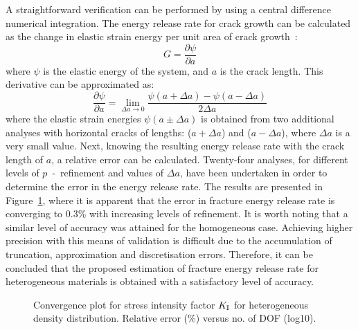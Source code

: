 \documentclass[onecolumn]{svjour3}
\begin{document}
A straightforward verification can be performed by using a central difference numerical integration. The energy release rate for crack growth can be calculated as the change in elastic strain energy per unit area of crack growth~\cite{Griffith163}:
\begin{equation}
G = \frac{\partial \psi}{\partial a}
\end{equation}
where $\psi$ is the elastic energy of the system, and $a$ is the crack length. This derivative can be approximated as:
\begin{equation}
 \frac{\partial \psi}{\partial a} = \lim_{\Delta a \to 0} \frac{\psi(a + \Delta a) - \psi(a -\Delta a)}{2\Delta a}
\end{equation}
where the elastic strain energies $\psi(a \pm \Delta a)$ is obtained from two additional analyses with horizontal cracks of lengths: ($a + \Delta a$) and ($a - \Delta a$), where $\Delta a$ is a very small value. 
Next, knowing the resulting energy release rate with the crack length of $a$, a relative error can be calculated. 
Twenty-four analyses, for different levels of $p$~-~refinement and values of $\Delta a$, have been undertaken in order to determine the error in the energy release rate. 
The results are presented in Figure~\ref{fig:covergencefdm}, where it is apparent that the error in fracture energy release rate is converging to 0.3\% 
with increasing levels of refinement. It is worth noting that a similar level of accuracy was attained for the homogeneous case.  Achieving higher precision with this means of validation is difficult due to the accumulation of truncation, approximation and discretisation errors.
Therefore, it can be concluded that the proposed estimation of fracture energy release rate for heterogeneous materials is obtained with a satisfactory level of accuracy.
\begin{figure}[h]
	\centering
	\caption{Convergence plot for stress intensity factor $K_{\rm I}$ for heterogeneous density distribution. Relative error (\%) versus no. of DOF (log10).}
	\label{fig:covergencefdm}
\end{figure}
\end{document}
